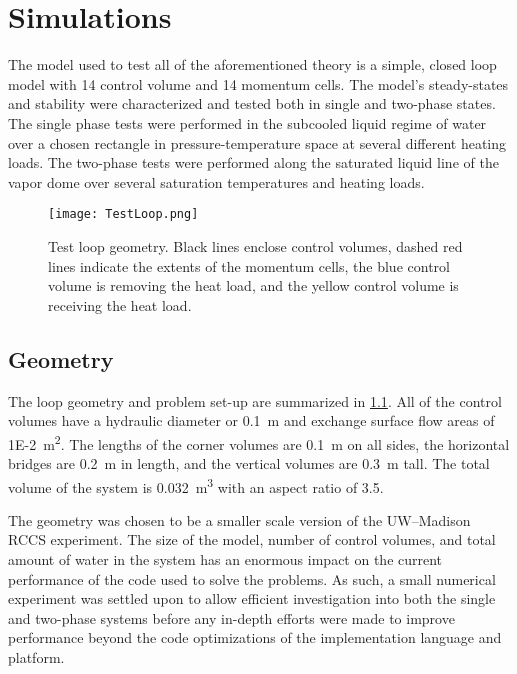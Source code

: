 \chapter{Simulations}\label{Chapter:Simulations}

The model used to test all of the aforementioned theory is a simple, closed loop model with 14 control volume and 14 momentum cells.
The model's steady-states and stability were characterized and tested both in single and two-phase states.
The single phase tests were performed in the subcooled liquid regime of water over a chosen rectangle in pressure-temperature space at several different heating loads.
The two-phase tests were performed along the saturated liquid line of the vapor dome over several saturation temperatures and heating loads.

\begin{figure}[H]%
    \centering
    \caption{Test loop geometry.  Black lines enclose control volumes, dashed red lines indicate the extents of the momentum cells, the blue control volume is removing the heat load, and the yellow control volume is receiving the heat load.}%
    \label{Fig:TestLoopSetUp}%
    \texttt{[image: TestLoop.png]}%
\end{figure}

\section{Geometry}

The loop geometry and problem set-up are summarized in \cref{Fig:TestLoopSetUp}.
All of the control volumes have a hydraulic diameter or \SI{0.1}{\meter} and exchange surface flow areas of \SI{1E-2}{\meter\squared}.
The lengths of the corner volumes are \SI{0.1}{\meter} on all sides, the horizontal bridges are \SI{0.2}{\meter} in length, and the vertical volumes are \SI{0.3}{\meter} tall.
The total volume of the system is \SI{0.032}{\meter\cubed} with an aspect ratio of \num{3.5}.

The geometry was chosen to be a smaller scale version of the UW--Madison RCCS experiment.
The size of the model, number of control volumes, and total amount of water in the system has an enormous impact on the current performance of the code used to solve the problems.
As such, a small numerical experiment was settled upon to allow efficient investigation into both the single and two-phase systems before any in-depth efforts were made to improve performance beyond the code optimizations of the implementation language and platform.




